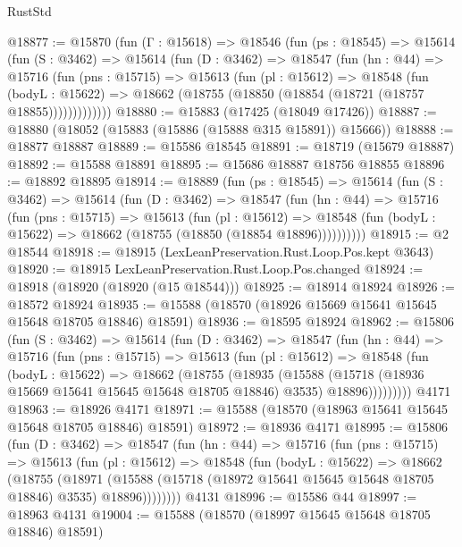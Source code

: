 \begin{lexlean}{RustStd}
\begin{coremodule}
@18877 := @15870
    (fun (Γ : @15618) =>
    @18546
      (fun (ps : @18545) =>
      @15614
        (fun (S : @3462) =>
        @15614
          (fun (D : @3462) =>
          @18547
            (fun (hn : @44) =>
            @15716
              (fun (pns : @15715) =>
              @15613
                (fun (pl : @15612) =>
                @18548
                  (fun (bodyL : @15622) =>
                  @18662 (@18755 (@18850 (@18854 (@18721 (@18757 @18855)))))))))))))
@18880 := @15883 (@17425 (@18049 @17426))
@18887 := @18880 (@18052 (@15883 (@15886 (@15888 @315 @15891)) @15666))
@18888 := @18877 @18887
@18889 := @15586 @18545
@18891 := @18719 (@15679 @18887)
@18892 := @15588 @18891
@18895 := @15686 @18887 @18756 @18855
@18896 := @18892 @18895
@18914 := @18889
    (fun (ps : @18545) =>
    @15614
      (fun (S : @3462) =>
      @15614
        (fun (D : @3462) =>
        @18547
          (fun (hn : @44) =>
          @15716
            (fun (pns : @15715) =>
            @15613
              (fun (pl : @15612) =>
              @18548 (fun (bodyL : @15622) => @18662 (@18755 (@18850 (@18854 @18896))))))))))
@18915 := @2 @18544
@18918 := @18915 (LexLeanPreservation.Rust.Loop.Pos.kept @3643)
@18920 := @18915 LexLeanPreservation.Rust.Loop.Pos.changed
@18924 := @18918 (@18920 (@18920 (@15 @18544)))
@18925 := @18914 @18924
@18926 := @18572 @18924
@18935 := @15588 (@18570 (@18926 @15669 @15641 @15645 @15648 @18705 @18846) @18591)
@18936 := @18595 @18924
@18962 := @15806
    (fun (S : @3462) =>
    @15614
      (fun (D : @3462) =>
      @18547
        (fun (hn : @44) =>
        @15716
          (fun (pns : @15715) =>
          @15613
            (fun (pl : @15612) =>
            @18548
              (fun (bodyL : @15622) =>
              @18662
                (@18755
                  (@18935
                    (@15588
                      (@15718 (@18936 @15669 @15641 @15645 @15648 @18705 @18846) @3535)
                      @18896)))))))))
    @4171
@18963 := @18926 @4171
@18971 := @15588 (@18570 (@18963 @15641 @15645 @15648 @18705 @18846) @18591)
@18972 := @18936 @4171
@18995 := @15806
    (fun (D : @3462) =>
    @18547
      (fun (hn : @44) =>
      @15716
        (fun (pns : @15715) =>
        @15613
          (fun (pl : @15612) =>
          @18548
            (fun (bodyL : @15622) =>
            @18662
              (@18755
                (@18971
                  (@15588 (@15718 (@18972 @15641 @15645 @15648 @18705 @18846) @3535) @18896))))))))
    @4131
@18996 := @15586 @44
@18997 := @18963 @4131
@19004 := @15588 (@18570 (@18997 @15645 @15648 @18705 @18846) @18591)

\end{coremodule}
\end{lexlean}
